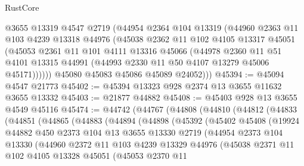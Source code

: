 \begin{lexlean}{RustCore}
\begin{coremodule}
          @3655
          @13319
          @4547
          @2719
          (@44954
            @2364
            @104
            @13319
            (@44960
              @2363
              @11
              @103
              @4239
              @13318
              @44976
              (@45038
                @2362
                @11
                @102
                @4105
                @13317
                @45051
                (@45053
                  @2361
                  @11
                  @101
                  @4111
                  @13316
                  @45066
                  (@44978
                    @2360
                    @11
                    @51
                    @4101
                    @13315
                    @44991
                    (@44993 @2330 @11 @50 @4107 @13279 @45006 @45171))))))
          @45080
          @45083
          @45086
          @45089
          @24052)))
@45394 := @45094 @4547 @21773
@45402 := @45394 @13323 @928 @2374 @13 @3655 @11632 @3655 @13332
@45403 := @21877 @44882
@45408 := @45403 @928 @13 @3655 @4549 @45116
@45474 := @44742
    (@44767
      (@44808
        (@44810
          (@44812
            (@44833
              (@44851
                (@44865
                  (@44883
                    (@44894
                      (@44898
                        (@45392
                          (@45402
                            @45408
                            (@19924
                              @44882
                              @450
                              @2373
                              @104
                              @13
                              @3655
                              @13330
                              @2719
                              (@44954
                                @2373
                                @104
                                @13330
                                (@44960
                                  @2372
                                  @11
                                  @103
                                  @4239
                                  @13329
                                  @44976
                                  (@45038
                                    @2371
                                    @11
                                    @102
                                    @4105
                                    @13328
                                    @45051
                                    (@45053
                                      @2370
                                      @11

\end{coremodule}
\end{lexlean}
